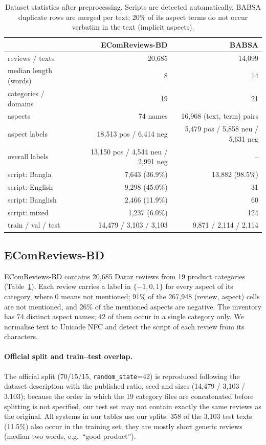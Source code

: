 \documentclass[11pt]{article}
\begin{document}
\begin{table}[t]
\centering\small
\begin{tabular}{lrr}
\toprule
 & EComReviews-BD & BABSA \\
\midrule
reviews / texts & 20,685 & 14,099 \\
median length (words) & 8 & 14 \\
categories / domains & 19 & 21 \\
aspects & 74 names & 16,968 (text, term) pairs \\
aspect labels & 18,513 pos / 6,414 neg & 5,479 pos / 5,858 neu / 5,631 neg \\
overall labels & 13,150 pos / 4,544 neu / 2,991 neg & -- \\
script: Bangla & 7,643 (36.9\%) & 13,882 (98.5\%) \\
script: English & 9,298 (45.0\%) & 31 \\
script: Banglish & 2,466 (11.9\%) & 60 \\
script: mixed & 1,237 (6.0\%) & 124 \\
train / val / test & 14,479 / 3,103 / 3,103 & 9,871 / 2,114 / 2,114 \\
\bottomrule
\end{tabular}
\caption{Dataset statistics after preprocessing. Scripts are detected automatically. BABSA duplicate
rows are merged per text; 20\% of its aspect terms do not occur verbatim in the text (implicit
aspects).}
\label{tab:data}
\end{table}

\subsection{EComReviews-BD}
EComReviews-BD \citep{haque2026ecomreviews} contains 20,685 Daraz reviews from 19 product categories
(Table~\ref{tab:data}). Each review carries a label in $\{-1,0,1\}$ for every aspect of its category,
where 0 means not mentioned; 91\% of the 267,948 (review, aspect) cells are not mentioned, and 26\% of
the mentioned aspects are negative. The inventory has 74 distinct aspect names; 42 of them occur in a
single category only. We normalise text to Unicode NFC and detect the script of each review from its
characters.

\paragraph{Official split and train--test overlap.}
The official split (70/15/15, \texttt{random\_state}=42) is reproduced following the dataset
description with the published ratio, seed and sizes (14,479 / 3,103 / 3,103); because the order in
which the 19 category files are concatenated before splitting is not specified, our test set may not
contain exactly the same reviews as the original. All systems in our tables use our splits. 358 of the
3,103 test texts (11.5\%) also occur in the training set; they are mostly short generic reviews (median
two words, e.g.\ ``good product'').
\end{document}
